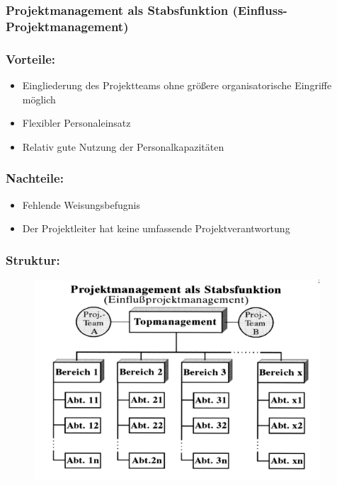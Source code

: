 \documentclass[11pt,a4paper]{article}
\begin{document}
\subsubsection{Projektmanagement als Stabsfunktion (Einfluss-Projektmanagement)}
\begin{minipage}[t]{0.5\textwidth}
	\subsubsection*{Vorteile:}

	\begin{itemize}
	\itemsep0em
		\item Eingliederung des Projektteams ohne größere organisatorische Eingriffe möglich
		\item Flexibler Personaleinsatz
		\item Relativ gute Nutzung der Personalkapazitäten
	\end{itemize}
	\subsubsection*{Nachteile:}

	\begin{itemize}
	\itemsep0em
		\item Fehlende Weisungsbefugnis
		\item Der Projektleiter hat keine umfassende Projektverantwortung
	\end{itemize}
\end{minipage}
\hspace{0.5cm}
\begin{minipage}[t]{0.45\textwidth}
	\subsubsection*{Struktur:}

	\begin{figure}[H]
	\includegraphics[width=0.95\textwidth]{stabsfunktion}
	\end{figure}
\end{minipage}
\end{document}
